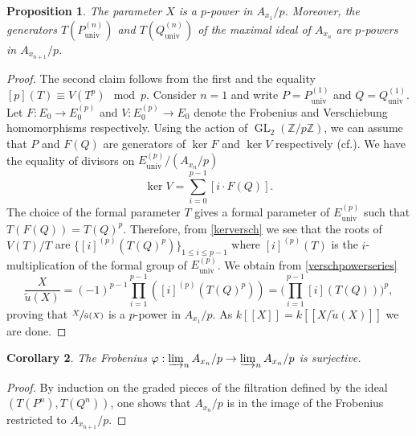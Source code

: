 \documentclass[11pt]{article}
\newcommand{\cf}{cf.\xspace}
\newcommand{\lcr}{[\![}
\newcommand{\rcr}{]\!]}
\newcommand{\univ}{\mathrm{univ}}
\numberwithin{equation}{section}
\newtheorem{prop}{Proposition}[section]
\newtheorem{cor}[prop]{Corollary}
\theoremstyle{definition}
\newcommand{\bb}[1]{\mathbb{#1}}
\DeclareMathOperator{\GL}{GL}
\begin{document}
\begin{prop}
\label{propSuperSingFrob}
The parameter $X$ is a $p$-power in $A_{x_1}/p$. Moreover, the generators $T(P^{(n)}_{\univ})$ and $T(Q^{(n)}_{\univ})$ of the maximal ideal of $A_{x_n}$ are $p$-powers in $A_{x_{n+1}}/p$.
\end{prop}

\begin{proof}
The second claim follows from the first and the equality $[p](T)\equiv V(T^p) \mod p$. Consider $n=1$ and write $P=P^{(1)}_{\univ}$ and $Q=Q^{(1)}_{\univ}$. Let $F: E_0\to E_0^{(p)}$ and $V: E_0^{(p)}\to E_0$ denote the Frobenius and Verschiebung homomorphisms respectively. Using the action of $\GL_2(\bb{Z}/p\bb{Z})$, we can assume that $P$ and $F(Q)$ are generators of $\ker F$ and $\ker V$ respectively (\cf \cite[Th.\,5.5.2]{katz1985arithmetic}). We have the equality of divisors on $E_{\univ}^{(p)}/(A_{x_n}/p)$
\begin{equation}
\label{kerversch}
\ker V= \sum_{i=0}^{p-1} [i\cdot F(Q)].
\end{equation}
The choice of the formal parameter $T$ gives a formal parameter of $E^{(p)}_{\univ}$ such that $T(F(Q))=T(Q)^p$. Therefore, from \eqref{kerversch} we see that the roots of $V(T)/T$ are $\{[i]^{(p)}(T(Q)^p)\}_{1\leq i\leq p-1}$ where $[i]^{(p)}(T)$ is the $i$-multiplication of the formal group of $E^{(p)}_{\univ}$. We obtain from \eqref{verschpowerseries}
\[
\frac{X}{\tilde{u}(X)}= (-1)^{p-1} \prod_{i=1}^{p-1} ([i]^{(p)}(T(Q)^p))= \biggl(\prod_{i=1}^{p-1}[i](T(Q))\biggr)^p,
\]
proving that $\sfrac{X}{\tilde{u}(X)}$ is a $p$-power in $A_{x_1}/p$. As $k\lcr X\rcr=k\lcr X/\tilde{u}(X)\rcr$ we are done.
\end{proof}

\begin{cor}
\label{corsupersingfrob}
The Frobenius $\varphi: \varinjlim_n A_{x_n}/p \to \varinjlim_n A_{x_n}/p$ is surjective.
\end{cor}

\begin{proof}
By induction on the graded pieces of the filtration defined by the ideal $(T(P^n),T(Q^n))$, one shows that $A_{x_n}/p$ is in the image of the Frobenius restricted to $A_{x_{n+1}}/p$.
\end{proof}
\end{document}
